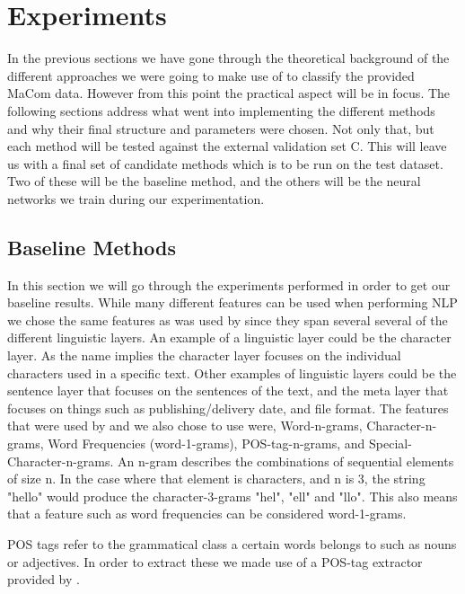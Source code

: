 \section{Experiments} \label{sec:experiments} 

In the previous sections we have gone through the theoretical background of
the different approaches we were going to make use of to classify the provided
MaCom data. However from this point the practical aspect will be in focus. The
following sections address what went into implementing the different methods and
why their final structure and parameters were chosen. Not only that, but each
method will be tested against the external validation set \gls{C}. This will
leave us with a final set of candidate methods which is to be run on the test
dataset. Two of these will be the baseline method, and the others will be the
neural networks we train during our experimentation.


\subsection{Baseline Methods} \label{subsec:baseline_methods}

In this section we will go through the experiments performed in order to get
our baseline results. While many different features can be used when performing
\gls{NLP} we chose the same features as was used by \citet{US} since they span
several several of the different linguistic layers. An example of a linguistic
layer could be the character layer. As the name implies the character layer
focuses on the individual characters used in a specific text. Other examples of
linguistic layers could be the sentence layer that focuses on the sentences of
the text, and the meta layer that focuses on things such as publishing/delivery
date, and file format. The features that were used by \citet{US} and we
also chose to use were, Word-n-grams, Character-n-grams, Word Frequencies
(word-1-grams), \gls{POS}-tag-n-grams, and Special-Character-n-grams. An n-gram
describes the combinations of sequential elements of size n. In the case where
that element is characters, and n is 3, the string "hello" would produce the
character-3-grams "hel", "ell" and "llo". This also means that a feature such as
word frequencies can be considered word-1-grams.

\gls{POS} tags refer to the grammatical class a certain words belongs to such
as nouns or adjectives. In order to extract these we made use of a POS-tag
extractor provided by \citet{polyglot}.

